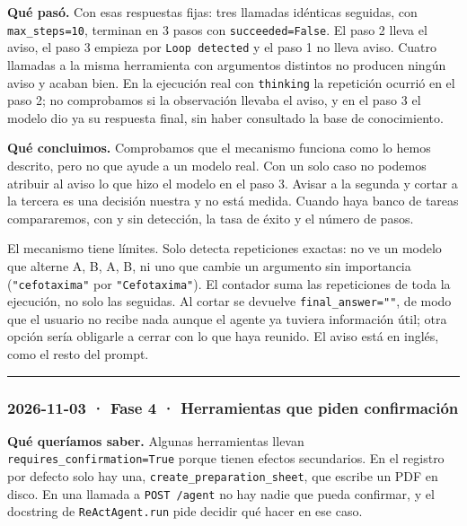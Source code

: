 \textbf{Qué pasó.} Con esas respuestas fijas: tres llamadas idénticas seguidas, con \texttt{max\_\allowbreak{}steps=\allowbreak{}10},
terminan en 3 pasos con \texttt{succeeded=\allowbreak{}False}. El paso 2 lleva el aviso, el paso 3 empieza por
\texttt{Loop detected} y el paso 1 no lleva aviso. Cuatro llamadas a la misma herramienta con argumentos
distintos no producen ningún aviso y acaban bien. En la ejecución real con \texttt{thinking} la repetición
ocurrió en el paso 2; no comprobamos si la observación llevaba el aviso, y en el paso 3 el modelo
dio ya su respuesta final, sin haber consultado la base de conocimiento.

\textbf{Qué concluimos.} Comprobamos que el mecanismo funciona como lo hemos descrito, pero no que ayude a
un modelo real. Con un solo caso no podemos atribuir al aviso lo que hizo el modelo en el paso 3.
Avisar a la segunda y cortar a la tercera es una decisión nuestra y no está medida. Cuando haya banco
de tareas compararemos, con y sin detección, la tasa de éxito y el número de pasos.

El mecanismo tiene límites. Solo detecta repeticiones exactas: no ve un modelo que alterne A, B, A, B, ni uno
que cambie un argumento sin importancia (\texttt{"cefotaxima"} por \texttt{"Cefotaxima"}). El contador suma las
repeticiones de toda la ejecución, no solo las seguidas. Al cortar se devuelve \texttt{final\_\allowbreak{}answer=\allowbreak{}""}, de
modo que el usuario no recibe nada aunque el agente ya tuviera información útil; otra opción sería
obligarle a cerrar con lo que haya reunido. El aviso está en inglés, como el resto del prompt.

\begin{center}\rule{0.5\linewidth}{0.5pt}\end{center}

\subsubsection{2026-11-03 · Fase 4 · Herramientas que piden confirmación}

\textbf{Qué queríamos saber.} Algunas herramientas llevan \texttt{requires\_\allowbreak{}confirmation=\allowbreak{}True} porque tienen
efectos secundarios. En el registro por defecto solo hay una, \texttt{create\_\allowbreak{}preparation\_\allowbreak{}sheet}, que escribe
un PDF en disco. En una llamada a \texttt{POST /\allowbreak{}agent} no hay nadie que pueda confirmar, y el docstring de
\texttt{ReActAgent.run} pide decidir qué hacer en ese caso.

